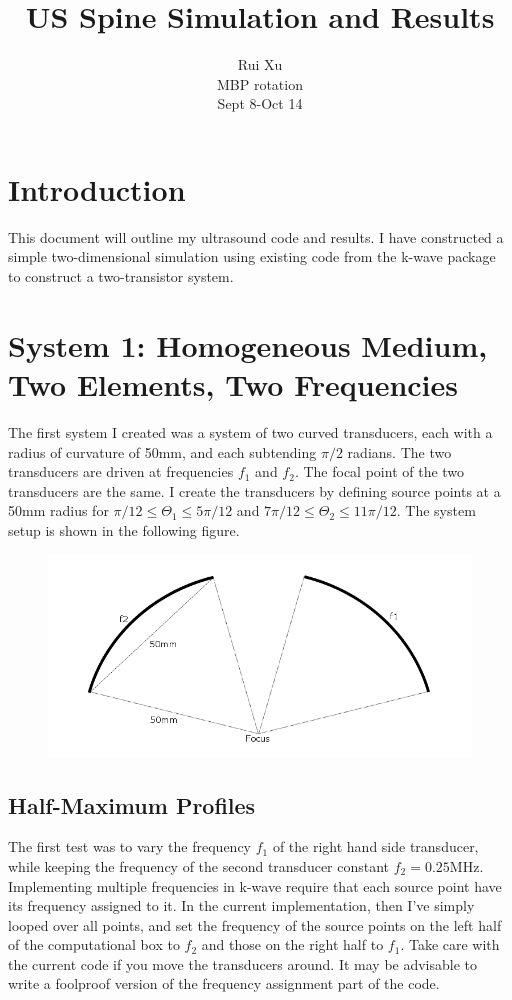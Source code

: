 \documentclass[10pt,a4paper]{article}
\title{US Spine Simulation and Results}
\author{Rui Xu \\ MBP rotation\\ Sept 8-Oct 14}
\begin{document}
\maketitle
\newpage

\section{Introduction}

This document will outline my ultrasound code and results. I have constructed a simple two-dimensional simulation using existing code from the k-wave package to construct a two-transistor system.

\section{System 1: Homogeneous Medium, Two Elements, Two Frequencies}

The first system I created was a system of two curved transducers, each with a radius of curvature of 50mm, and each subtending $\pi/2$ radians. The two transducers are driven at frequencies $f_1$ and $f_2$. The focal point of the two transducers are the same. I create the transducers by defining source points at a 50mm radius for $\pi/12 \leq \Theta_1 \leq 5\pi/12$ and $7\pi/12 \leq \Theta_2 \leq 11 \pi/12$. The system setup is shown in the following figure.

\begin{figure}[!h]
\centering
\includegraphics[scale=0.5]{setup1.png}
\centering
\end{figure}

\subsection{Half-Maximum Profiles}

The first test was to vary the frequency $f_1$ of the right hand side transducer, while keeping the frequency of the second transducer constant $f_2 = 0.25$MHz. Implementing multiple frequencies in k-wave require that each source point have its frequency assigned to it. In the current implementation, then I've simply looped over all points, and set the frequency of the source points on the left half of the computational box to $f_2$ and those on the right half to $f_1$. Take care with the current code if you move the transducers around. It may be advisable to write a foolproof version of the frequency assignment part of the code.\\
\end{document}
